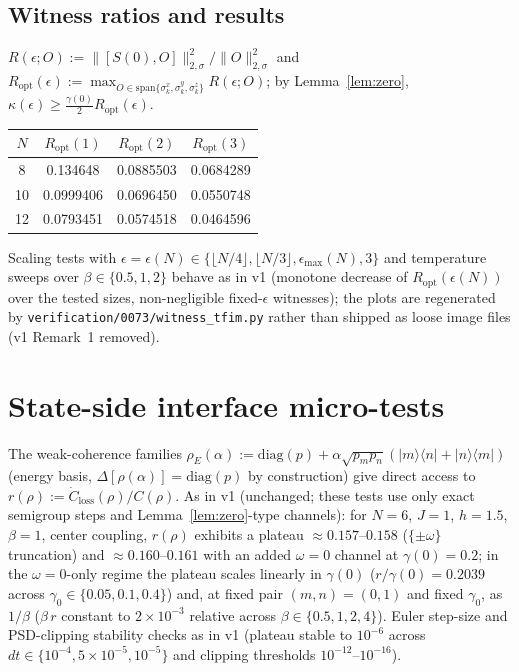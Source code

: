 \documentclass[11pt,a4paper]{article}
\theoremstyle{plain}
\theoremstyle{definition}
\theoremstyle{remark}
\newcommand{\eps}{\epsilon}
\newcommand{\normsig}[1]{\lVert #1 \rVert_{2,\sigma}}
\begin{document}
\subsection{Witness ratios and results}

$R(\eps; O) := \normsig{[S(0), O]}^2/\normsig{O}^2$ and
$R_{\mathrm{opt}}(\eps) := \max_{O\in\mathrm{span}\{\sigma^x_k, \sigma^y_k,
\sigma^z_k\}} R(\eps; O)$; by Lemma~\ref{lem:zero}, $\kappa(\eps) \ge
\tfrac{\gamma(0)}{2}R_{\mathrm{opt}}(\eps)$.

\begin{center}
\begin{tabular}{c c c c}
\hline
$N$ & $R_{\mathrm{opt}}(1)$ & $R_{\mathrm{opt}}(2)$ & $R_{\mathrm{opt}}(3)$\\
\hline
8 & 0.134648 & 0.0885503 & 0.0684289\\
10 & 0.0999406 & 0.0696450 & 0.0550748\\
12 & 0.0793451 & 0.0574518 & 0.0464596\\
\hline
\end{tabular}
\end{center}

Scaling tests with $\eps = \eps(N) \in \{\lfloor N/4\rfloor, \lfloor
N/3\rfloor, \eps_{\max}(N), 3\}$ and temperature sweeps over $\beta \in
\{0.5, 1, 2\}$ behave as in v1 (monotone decrease of
$R_{\mathrm{opt}}(\eps(N))$ over the tested sizes, non-negligible fixed-$\eps$
witnesses); the plots are regenerated by
\texttt{verification/0073/witness\_tfim.py} rather than shipped as loose
image files (v1 Remark~1 removed).

\section{State-side interface micro-tests}\label{sec:micro}

The weak-coherence families $\rho_E(\alpha) := \mathrm{diag}(p) +
\alpha\sqrt{p_m p_n}(|m\rangle\langle n| + |n\rangle\langle m|)$ (energy
basis, $\Delta[\rho(\alpha)] = \mathrm{diag}(p)$ by construction) give direct
access to $r(\rho) := \dot{C}_{\mathrm{loss}}(\rho)/C(\rho)$. As in v1
(unchanged; these tests use only exact semigroup steps and
Lemma~\ref{lem:zero}-type channels): for $N = 6$, $J = 1$, $h = 1.5$,
$\beta = 1$, center coupling, $r(\rho)$ exhibits a plateau
$\approx 0.157$--$0.158$ ($\{\pm\omega\}$ truncation) and
$\approx 0.160$--$0.161$ with an added $\omega = 0$ channel at
$\gamma(0) = 0.2$; in the $\omega = 0$-only regime the plateau scales
linearly in $\gamma(0)$ ($r/\gamma(0) = 0.2039$ across
$\gamma_0 \in \{0.05, 0.1, 0.4\}$) and, at fixed pair $(m, n) = (0, 1)$ and
fixed $\gamma_0$, as $1/\beta$ ($\beta\, r$ constant to $2\times 10^{-3}$
relative across $\beta \in \{0.5, 1, 2, 4\}$). Euler step-size and
PSD-clipping stability checks as in v1 (plateau stable to $10^{-6}$ across
$dt \in \{10^{-4}, 5\times 10^{-5}, 10^{-5}\}$ and clipping thresholds
$10^{-12}$--$10^{-16}$).
\end{document}
